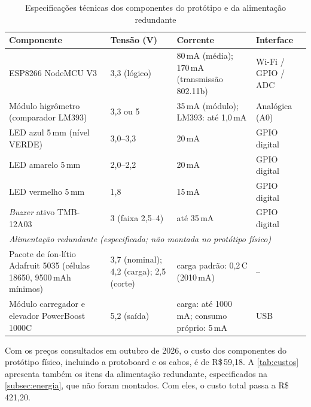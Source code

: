 \begin{table}[H]
\centering
\caption{Especificações técnicas dos componentes do protótipo e da alimentação redundante}
\label{tab:specs}
\small
\begin{tabular}{p{5.5cm}p{2.9cm}p{3.6cm}p{3.0cm}}
\hline
\textbf{Componente} & \textbf{Tensão (V)} & \textbf{Corrente} & \textbf{Interface} \\
\hline
ESP8266 NodeMCU V3 & 3,3 (lógico) & 80\,mA (média); 170\,mA (transmissão 802.11b) & Wi-Fi / GPIO / ADC \\
Módulo higrômetro (comparador LM393) & 3,3 ou 5 & 35\,mA (módulo); LM393: até 1,0\,mA & Analógica (A0) \\
LED azul 5\,mm (nível VERDE) & 3,0--3,3 & 20\,mA & GPIO digital \\
LED amarelo 5\,mm & 2,0--2,2 & 20\,mA & GPIO digital \\
LED vermelho 5\,mm & 1,8 & 15\,mA & GPIO digital \\
\textit{Buzzer} ativo TMB-12A03 & 3 (faixa 2,5--4) & até 35\,mA & GPIO digital \\
\hline
\multicolumn{4}{l}{\textit{Alimentação redundante (especificada; não montada no protótipo físico)}} \\
\hline
Pacote de íon-lítio Adafruit 5035 (células 18650, 9500\,mAh mínimos) & 3,7 (nominal); 4,2 (carga); 2,5 (corte) & carga padrão: 0,2\,C (2010\,mA) & -- \\
Módulo carregador e elevador PowerBoost 1000C & 5,2 (saída) & carga: até 1000\,mA; consumo próprio: 5\,mA & USB \\
\hline
\end{tabular}
\end{table}

Com os preços consultados em outubro de 2026, o custo dos componentes
do protótipo físico, incluindo a protoboard e os cabos, é de R\$\,59,18. A \autoref{tab:custos} apresenta
também os itens da alimentação redundante, especificados na
\autoref{subsec:energia}, que não foram montados. Com eles, o custo
total passa a R\$\,421,20.


